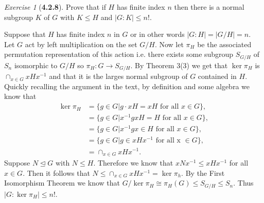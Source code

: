 \documentclass[12pt]{amsart}
\makeatletter
\theoremstyle{remark}
\newtheorem*{exercise}{Exercise}%
\renewenvironment{proof}[1][\proofname]{\par\doublespacing
  \pushQED{\qed}%
  \normalfont \topsep6\p@\@plus6\p@\relax
  \list{}{%
    \settowidth{\leftmargin}{\itshape\proofname:\hskip\labelsep}%
    \setlength{\labelwidth}{0pt}%
    \setlength{\itemindent}{-\leftmargin}%
  }%
  \item[\hskip\labelsep\itshape#1\@addpunct{:}]\ignorespaces
}{%
  \popQED\endlist\@endpefalse
  \singlespacing
}
\theoremstyle{mycomment}
\makeatother
\begin{document}
\begin{exercise}[\textbf{4.2.8}] Prove that if $H$ has finite index $n$ then there is a normal subgroup $K$ of $G$ with $K \leq H$ and $|G:K| \leq n!$. 
  \begin{proof} Suppose that $H$ has finite index $n$ in $G$ or in other words $|G:H| = |G/H| = n$. Let $G$ act by left multiplication on the set $G/H$. Now let $\pi_H$ be the associated permutation representation of this action i.e. there exists some subgroup $S_{G/H}$ of $S_n$ isomorphic to $G/H$ so $\pi_H: G \to S_{G/H}$. By Theorem 3(3) we get that $\ker \pi_H$ is $\cap_{x \in G}xHx^{-1}$ and that it is the larges normal subgroup of $G$ contained in $H$. Quickly recalling the argument in the text, by definition and some algebra we know that
    \begin{align*}
      \ker \pi_H  &= \{g \in G| g \cdot xH = xH\text{ for all }x \in G\},\\
      &= \{g \in G| x^{-1}gxH = H\text{  for all }x \in G\},\\
      &= \{g \in G| x^{-1}gx \in H\text{  for all }x \in G\},\\
      &= \{g \in G| g \in xHx^{-1}\text{  for all x }\in G\},\\
      &= \cap_{x \in G}xHx^{-1}.
    \end{align*} 
    Suppose $N \trianglelefteq G$ with $N \leq H$. Therefore we know that $xNx^{-1} \leq xHx^{-1}$ for all $x \in G$. Then it follows that $N \leq \cap_{x \in G}xHx^{-1} = \ker \pi_h$. 
    By the First Isomorphism Theorem we know that $G/\ker \pi_H \cong \pi_H(G) \leq S_{G/H} \leq S_n$. Thus $|G:\ker \pi_H| \leq n!$. 
  \end{proof}
\end{exercise}
\vspace{.15in}
\end{document}

